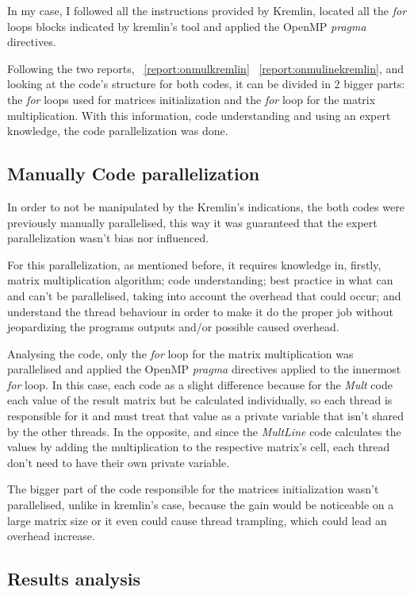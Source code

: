 In my case, I followed all the instructions provided by Kremlin, located all the \textit{for} loops blocks indicated by kremlin's tool and applied the OpenMP \textit{pragma} directives. 

Following the two reports, ~\ref{report:onmulkremlin} ~\ref{report:onmulinekremlin}, and looking at the code's structure for both codes, it can be divided in 2 bigger parts: the \textit{for} loops used for matrices initialization and the \textit{for} loop for the matrix multiplication. With this information, code understanding and using an expert knowledge, the code parallelization was done.


\subsection{Manually Code parallelization}

In order to not be manipulated by the Kremlin's indications, the both codes were previously manually parallelised, this way it was guaranteed that the expert parallelization wasn't bias nor influenced.

For this parallelization, as mentioned before, it requires knowledge in, firstly, matrix multiplication algorithm; code understanding; best practice in what can and can't be parallelised, taking into account the overhead that could occur; and understand the thread behaviour in order to make it do the proper job without jeopardizing the programs outputs and/or possible caused overhead.  

Analysing the code, only the \textit{for} loop for the matrix multiplication was parallelised and applied the OpenMP \textit{pragma} directives applied to the innermost \textit{for} loop. In this case, each code as a slight difference because for the \textit{Mult} code each value of the result matrix but be calculated individually, so each thread is responsible for it and must treat that value as a private variable that isn't shared by the other threads. In the opposite, and since the \textit{MultLine} code calculates the values by adding the multiplication to the respective matrix's cell, each thread don't need to have their own private variable.

The bigger part of the code responsible for the matrices initialization wasn't parallelised, unlike in kremlin's case, because the gain would be noticeable on a large matrix size or it even could cause thread trampling, which could lead an overhead increase. 


\subsection{Results analysis}

